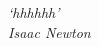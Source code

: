 \begin{epigrafe}
    \vspace*{\fill}
	\begin{flushright}
		\textit{`hhhhhh'\\ Isaac Newton}
	\end{flushright}
\end{epigrafe}